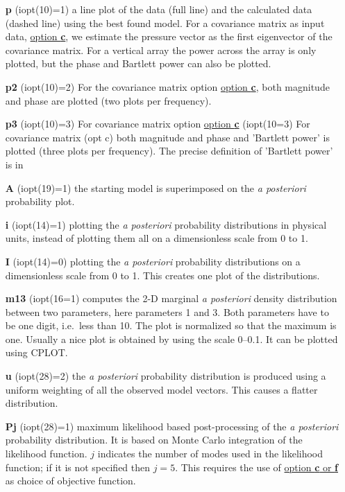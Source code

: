 \documentclass{saclantc}
\begin{document}
\vspace{-0.6cm}
\begin{itemize}
    \item[{\bf p}] (iopt(10)=1) a line plot of the data (full line)
 and the calculated
data (dashed line) using the best found model. For a covariance matrix
as input data, 
\underline{option {\bf c}}, we estimate the pressure vector 
as the first eigenvector of the covariance matrix. 
For a vertical array the power across the array is only plotted, but
the phase and Bartlett power can also be plotted.
 \vspace{-0.3cm}
   \item[{\bf p2}] (iopt(10)=2) For the covariance matrix option
\underline{option {\bf c}}, both magnitude and phase are plotted (two plots per frequency).

\vspace{-0.3cm}
   \item[{\bf p3}] (iopt(10)=3) For covariance matrix option \underline{option {\bf c}} (iopt(10=3) For covariance matrix (opt c) both magnitude and phase and
   'Bartlett power' is plotted (three plots per frequency). The
   precise definition of 'Bartlett power' is in \cite{gerstoft:asa96}

\vspace{-0.3cm}
    \item[{\bf A}] (iopt(19)=1) the starting model is superimposed on the
{\it a posteriori } probability plot.
\vspace{-0.3cm}
    \item[{\bf i}] (iopt(14)=1) plotting the {\it a posteriori}
 probability distributions in physical
units, instead of plotting them all on a dimensionless scale from 0 to
1.
\vspace{-0.3cm}
    \item[{\bf I}] (iopt(14)=0) plotting the {\it a posteriori}
 probability distributions  on a dimensionless scale from 0 to 1.
This creates  one plot of the distributions.
\vspace{-0.3cm}
    \item[{\bf m13}] (iopt(16=1) computes the 2-D marginal {\it a
posteriori} density distribution between two parameters, here
parameters 1 and 3. Both
parameters have to be one digit, i.e.\ less than 10. 
The plot is normalized so that the maximum is one.
Usually a nice plot is obtained by using the scale 0--0.1.
It can be  plotted using {\sf CPLOT}.
\vspace{-0.3cm}
    \item[{\bf u}] (iopt(28)=2) the  {\it a posteriori} probability
distribution is produced using a uniform weighting of all the observed
model vectors. This causes a flatter distribution.
\vspace{-0.3cm}
    \item[{\bf Pj}] (iopt(28)=1) maximum likelihood based
post-processing of the {\it a posteriori} probability distribution. 
    It is based on Monte Carlo integration of the likelihood
function.  $j$ indicates the number of modes used in the likelihood
function; if it is not specified then  $j=5$. 
This requires the use of \underline{option {\bf c}
or  {\bf f}} as choice of objective function.
\end{itemize}
\end{document}
